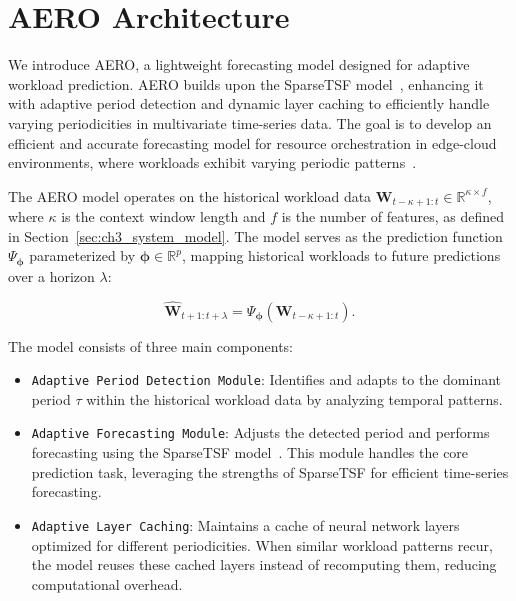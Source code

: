\section{AERO Architecture}
\label{sec:ch3_proposed_solution}

We introduce \ac{AERO}, a lightweight forecasting model designed for adaptive workload prediction. AERO builds upon the \ac{SparseTSF} model~\cite{sparseTSF}, enhancing it with adaptive period detection and dynamic layer caching to efficiently handle varying periodicities in multivariate time-series data. The goal is to develop an efficient and accurate forecasting model for resource orchestration in edge-cloud environments, where workloads exhibit varying periodic patterns~\cite{ouyang2023dynamic}.

The \ac{AERO} model operates on the historical workload data $\mathbf{W}_{t-\kappa+1:t} \in \mathbb{R}^{\kappa \times f}$, where $\kappa$ is the context window length and $f$ is the number of features, as defined in Section~\ref{sec:ch3_system_model}. The model serves as the prediction function $\Psi_{\boldsymbol{\phi}}$ parameterized by $\boldsymbol{\phi} \in \mathbb{R}^p$, mapping historical workloads to future predictions over a horizon $\lambda$:

\begin{equation}
\label{eq:aero_prediction_function}
\hat{\mathbf{W}}_{t+1:t+\lambda} = \Psi_{\boldsymbol{\phi}}\left( \mathbf{W}_{t-\kappa+1:t} \right).
\end{equation}

The model consists of three main components:

\begin{itemize}
    \item \texttt{Adaptive Period Detection Module}: Identifies and adapts to the dominant period $\tau$ within the historical workload data by analyzing temporal patterns.

    \item \texttt{Adaptive Forecasting Module}: Adjusts the detected period and performs forecasting using the \ac{SparseTSF} model~\cite{sparseTSF}. This module handles the core prediction task, leveraging the strengths of \ac{SparseTSF} for efficient time-series forecasting.

    \item \texttt{Adaptive Layer Caching}: Maintains a cache of neural network layers optimized for different periodicities. When similar workload patterns recur, the model reuses these cached layers instead of recomputing them, reducing computational overhead.
\end{itemize}

